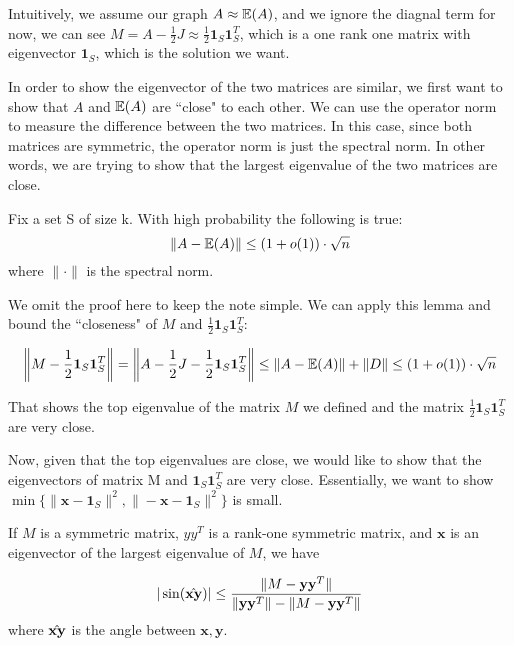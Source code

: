\documentclass{article}
\begin{document}
Intuitively, we assume our graph $A \approx \operatorname{\mathbb{E}}(A)$, and we ignore the diagnal
term for now, we can see $M = A - \frac{1}{2}J \approx \frac{1}{2} \mathbf{1}_S
\mathbf{1}_S^T$, which is a one rank one matrix with eigenvector
$\mathbf{1}_S$, which is the solution we want. 

In order to show the eigenvector of the two matrices are similar, we first want
to show that $A$ and $\operatorname{\mathbb{E}}(A)$ are ``close" to each other. We can use the operator norm to measure the difference between the two matrices. In this case, since both matrices are symmetric, the operator norm is just the spectral norm. In other words, we are trying to show that the largest eigenvalue of the two matrices are close. 

\begin{lemma}
Fix a set S of size k. With high probability the following is true:
$$\|A-\operatorname{\mathbb{E}}(A)\| \leq (1+o(1))\cdot \sqrt{n}$$
where $\|\cdot\|$ is the spectral norm.
\end{lemma} 
We omit the proof here to keep the note simple. 
We can apply this lemma and bound the ``closeness" of $M$ and $\frac{1}{2}\mathbf{1}_S\mathbf{1}_S^T$:

$$\left\|M- \frac{1}{2}\mathbf{1}_S\mathbf{1}_S^T\right\| =
\left\|A-\frac{1}{2}J - \frac{1}{2}\mathbf{1}_S\mathbf{1}_S^T\right\| \leq \|A-\operatorname{\mathbb{E}}(A)\|   + \|D\|\leq(1+o(1))\cdot \sqrt{n}$$

That shows the top eigenvalue of the matrix $M$ we defined and the matrix $ \frac{1}{2}\mathbf{1}_S\mathbf{1}_S^T$ are very close.

Now, given that the top eigenvalues are close, we would like to show that the eigenvectors of matrix M and $\mathbf{1}_S\mathbf{1}_S^T$ are very close. Essentially, we want to show
$\min\{\|\mathbf{x}-\mathbf{1}_S\|^2, \|-\mathbf{x}-\mathbf{1}_S\|^2\}$ is small.
\begin{theorem}
If $M$ is a symmetric matrix, $yy^T$ is a rank-one symmetric matrix, and $\mathbf{x}$ is an eigenvector of the largest eigenvalue of $M$, we have

$$|\sin(\Hat{\mathbf{x} \mathbf{y}})| \leq \dfrac{\|M - \mathbf{y}\mathbf{y}^T\|}{\|\mathbf{y}\mathbf{y}^T\| - \|M - \mathbf{y}\mathbf{y}^T\|}$$
where $\Hat{\mathbf{x}\mathbf{y}}$ is the angle between $\mathbf{x}, \mathbf{y}$.
\end{theorem}
\end{document}
